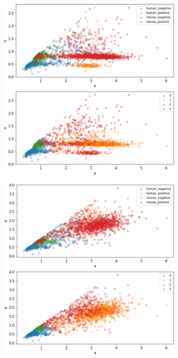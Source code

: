\begin{figure}
	\centering
	\begin{subfigure}{0.49\textwidth}
		\includegraphics[width=\textwidth]{fig/seperate_a_u}
	\end{subfigure}
	\hfill
	\begin{subfigure}{0.49\textwidth}
		\includegraphics[width=\textwidth]{fig/seperate_a_d}

\end{subfigure}
\end{figure}

